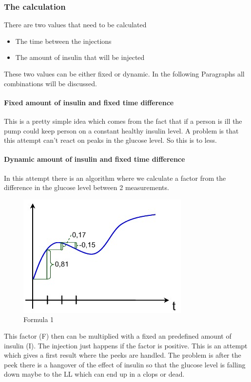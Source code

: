 \subsubsection{The calculation}
There are two values that need to be calculated
\begin{itemize}
  \item The time between the injections
  \item The amount of insulin that will be injected  
\end{itemize}
These two values can be either fixed or dynamic. In the following Paragraphs all combinations will be discussed.

\paragraph{Fixed amount of insulin and fixed time difference}
This is a pretty simple idea which comes from the fact that if a person is ill the pump could keep person on a constant healthy insulin level. A problem is that this attempt can’t react on peaks in the glucose level. So this is to less.

\paragraph{Dynamic amount of insulin and fixed time difference}
In this attempt there is an algorithm where we calculate a factor from the difference in the glucose level between 2 measurements.
\begin{figure}[htb]
\centering
\includegraphics[width=\textwidth]{images/graf1.jpg}
\caption{Formula 1}
\label{fig:formula_1}
\end{figure}
This factor (F) then can be multiplied with a fixed an predefined amount of insulin (I). The injection just happens if the factor is positive. This is an attempt which gives a first result where the peeks are handled. The problem is after the peek there is a hangover of the effect of insulin so that the glucose level is falling down maybe to the LL which can end up in a clops or dead.

